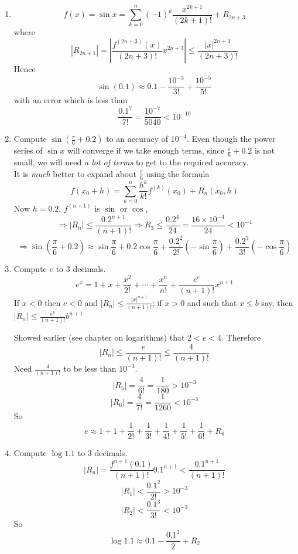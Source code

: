 \documentclass[12pt]{report}
\theoremstyle{definition}
\begin{document}
\begin{ex}
    \,

    \begin{enumerate}[label = (\arabic*)]
        \item \[
            f(x) = \sin{x} = \sum_{k=0}^{n} {(-1)}^{k}\frac{x^{2k+1}}{(2k+1)!} + R_{2n+3}
        \]where\[
            |R_{2n+1}| = \left|\frac{f^{(2n+3)}(x)}{(2n+3)!}x^{2n+3}\right| \le \frac{{|x|}^{2n+3}}{(2n+3)!}
        \]Hence \[
        \sin{(0.1)} \approx 0.1 - \frac{10^{-3}}{3!} + \frac{10^{-5}}{5!}
        \]with an error which is less than\[
            \frac{0.1^{7}}{7!} = \frac{10^{-7}}{5040} < 10^{-10}
        \]
        \item Compute $\sin{(\frac{\pi}{6} + 0.2)}$ to an accuracy of $10^{-4}$.
            Even though the power series of $\sin{x}$ will converge if we take enough terms,
            since $\frac{\pi}{6} + 0.2$ is not small, we will need \emph{a lot of terms} to get to the required accuracy.
            \\It is \emph{much} better to expand about $\frac{\pi}{6}$ using the formula \[
                f(x_0 + h) = \sum_{k=0}^{n} \frac{h^{k}}{k!}f^{(k)}(x_0) + R_n(x_0,h)
            \]Now $h = 0.2$, $f^{(n+1)}$ is $\sin$ or $\cos$, \[
            \Rightarrow |R_n| \le \frac{0.2^{n+1}}{(n+1)!}
            \Rightarrow R_3 \le \frac{0.2^{4}}{24} = \frac{16 \times 10^{-4}}{24} < 10^{-4}
            \]\[
            \Rightarrow \sin{\left(\frac{\pi}{6} + 0.2\right)} \approx \sin{\frac{\pi}{6}} + 0.2\cos{\frac{\pi}{6}} 
            + \frac{0.2^{2}}{2!} \left(-\sin{\frac{\pi}{6}}\right) + \frac{0.2^{3}}{3!}\left(-\cos{\frac{\pi}{6}}\right) 
            \]
        \item Compute $e$ to 3 decimals. \[
                e^{x} = 1 + x + \frac{x^{2}}{2!} + \cdots + \frac{x^{n}}{n!} + \frac{e^{c}}{(n+1)!} x^{n+1}
            \]If $x<0$ then $c<0$ and $|R_n| \le \frac{{|x|}^{n+1}}{(n+1)!}$;
            if $x>0$ and such that $x \le b$ say, then $|R_n| \le \frac{e^{b}}{(n+1)!} b^{n+1}$

        Showed earlier (see chapter on logarithms) that $2<e<4$. Therefore\[
                |R_n| \le \frac{e}{(n+1)!} \le \frac{4}{(n+1)!}
            \]Need $\frac{4}{(n+1)!}$ to be less than $10^{-3}$. \[
                |R_5| = \frac{4}{6!} = \frac{1}{180} > 10^{-3}
            \]\[
                |R_6| = \frac{4}{7!} = \frac{1}{1260} < 10^{-3}
            \]So \[
                e \approx 1 + 1 + \frac{1}{2!} + \frac{1}{3!} + \frac{1}{4!} + \frac{1}{5!} + \frac{1}{6!} + R_6
            \]
        \item Compute $\log{1.1}$ to 3 decimals.\[
                |R_n| = \frac{f^{n+1}(0.1)}{(n+1)!} 0.1^{n+1} < \frac{0.1^{n+1}}{(n+1)!}
        \]\[
            |R_1| < \frac{0.1^{2}}{2!} > 10^{-3}
        \]\[
            |R_2| < \frac{0.1^{3}}{3!} < 10^{-3}
        \]So\[
        \log{1.1} \approx 0.1 - \frac{0.1^{2}}{2} + R_2
        \]
    \end{enumerate}
\end{ex}
\end{document}
